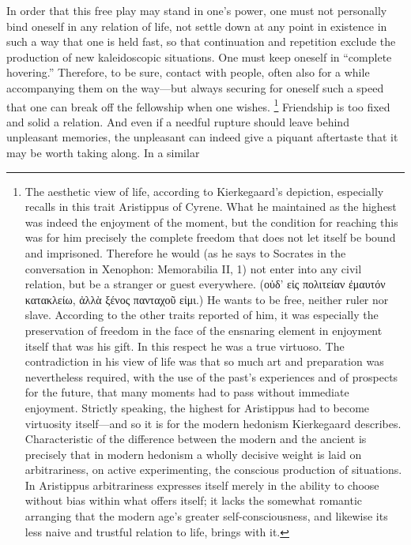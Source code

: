 \documentclass[12pt,a4paper]{book}
\newcommand{\opage}[1]{\marginnote{\footnotesize\textit{[#1]}}}
\begin{document}
In order that this free play may stand in one's power, one must not
personally bind oneself in any relation of life, not
\opage{84}settle down at any point in existence in such a way that one is
held fast, so that continuation and repetition exclude the production of
new kaleidoscopic situations. One must keep oneself in ``complete
hovering.'' Therefore, to be sure, contact with people, often also for a
while accompanying them on the way---but always securing for oneself such
a speed that one can break off the fellowship when one wishes.%
\footnote{The aesthetic view of life, according to Kierkegaard's
depiction, especially recalls in this trait Aristippus of Cyrene. What he
maintained as the highest was indeed the enjoyment of the moment, but the
condition for reaching this was for him precisely the complete freedom
that does not let itself be bound and imprisoned. Therefore he would (as
he says to Socrates in the conversation in Xenophon: Memorabilia II, 1)
not enter into any civil relation, but be a stranger or guest everywhere.
(οὐδ' εἰς πολιτείαν ἐμαυτόν κατακλείω, ἀλλὰ ξένος πανταχοῦ εἰμι.) He
wants to be free, neither ruler nor slave. According to the other traits
reported of him, it was especially the preservation of freedom in the
face of the ensnaring element in enjoyment itself that was his gift. In
this respect he was a true virtuoso. The contradiction in his view of life
was that so much art and preparation was nevertheless required, with the
use of the past's experiences and of prospects for the future, that many
moments had to pass without immediate enjoyment. Strictly speaking, the
highest for Aristippus had to become virtuosity itself---and so it is for
the modern hedonism Kierkegaard describes. Characteristic of the
difference between the modern and the ancient is precisely that in modern
hedonism a wholly decisive weight is laid on arbitrariness, on active
experimenting, the conscious production of situations. In Aristippus
arbitrariness expresses itself merely in the ability to choose without
bias within what offers itself; it lacks the somewhat romantic arranging
that the modern age's greater self-consciousness, and likewise its less
naive and trustful relation to life, brings with it.}
Friendship is too fixed and solid a relation. And even if a needful
rupture should leave behind unpleasant memories, the unpleasant can indeed
give a piquant aftertaste that it may be worth taking along. In a similar
\end{document}
